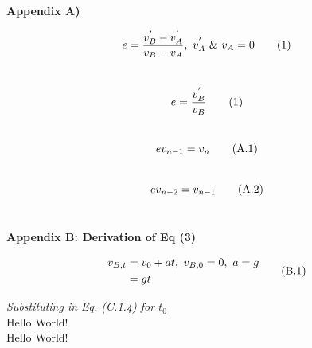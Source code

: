 \documentclass[x11names][12pt]{article}
\begin{document}
\renewcommand{\baselinestretch}{2.0}
\setcounter{page}{11}

\begin{center}
\textbf{Appendix A)}
\end{center}

\begin{equation}
e = \frac{v_B^{'} - v_A^{'}}{v_B - v_A}, \ v_A^{'} \ \& \ v_A = 0 \tag{1}\\
\end{equation}\\
\begin{equation}
e = \frac{v_B^{'}}{v_B}\tag{1}\\
\end{equation}\\
\begin{equation}
ev_{n-1} = v_n \tag{A.1}\\
\end{equation}\\
\begin{equation}
ev_{n-2} =v_{n-1} \tag{A.2}\\
\end{equation}\\


\pagebreak
\begin{center}
\textbf{Appendix B: Derivation of Eq (3)}
\end{center}

\begin{equation}
\begin{aligned} \nonumber
v_{B,t} & = v_0 + at, \ v_{B,0} = 0,  \ a = g\\ \nonumber 
	   & = gt
\end{aligned}\\ \tag{B.1}
\end{equation}

\noindent \textit{Substituting in Eq. (C.1.4) for $t_0$}\\


\textcolor{Firebrick1}{Hello World!}\\
\colorbox{Thistle3}{Hello World!}\\
\end{document}
